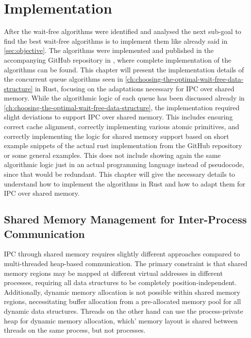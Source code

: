\chapter{Implementation}\label{ch:implementation}

After the wait-free algorithms were identified and analysed the next sub-goal to find the best wait-free algorithms is to implement them like already said in \cref{sec:objective}. The algorithms were implemented and published in the accompanying GitHub repository in \cite{githubMA}, where complete implementation of the algorithms can be found. This chapter will present the implementation details of the concurrent queue algorithms seen in \cref{ch:choosing-the-optimal-wait-free-data-structure} in Rust, focusing on the adaptations necessary for \ac{IPC} over shared memory. While the algorithmic logic of each queue has been discussed already in \cref{ch:choosing-the-optimal-wait-free-data-structure}, the implementation required slight deviations to support \ac{IPC} over shared memory. This includes ensuring correct cache alignment, correctly implementing various atomic primitives, and correctly implementing the logic for shared memory support based on short example snippets of the actual rust implementation from the GitHub repository or some general examples. This does not include showing again the same algorithmic logic just in an actual programming language instead of pseudocode, since that would be redundant. This chapter will give the necessary details to understand how to implement the algorithms in Rust and how to adapt them for \ac{IPC} over shared memory.

\section{Shared Memory Management for Inter-Process Communication}

\ac{IPC} through shared memory requires slightly different approaches compared to multi-threaded heap-based communication. The primary constraint is that shared memory regions may be mapped at different virtual addresses in different processes, requiring all data structures to be completely position-independent. Additionally, dynamic memory allocation is not possible within shared memory regions, necessitating buffer allocation from a pre-allocated memory pool for all dynamic data structures. Threads on the other hand can use the process-private heap for dynamic memory allocation, which' memory layout is shared between threads on the same process, but not processes.  

